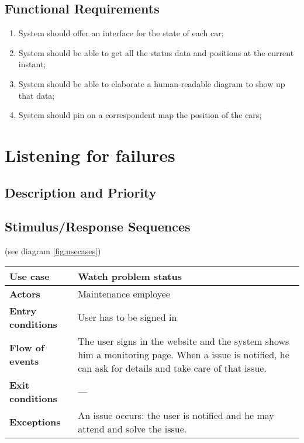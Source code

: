 \documentclass{scrreprt}
\begin{document}
\subsection{Functional Requirements}
\begin{enumerate}[label=R\arabic*.,resume]
\item System should offer an interface for the state of each car;
\item System should be able to get all the status data and positions at the current instant;
\item System should be able to elaborate a human-readable diagram to show up that data; 
\item System should pin on a correspondent map the position of the cars;
\end{enumerate}

\section{Listening for failures}
\subsection{Description and Priority}

\subsection{Stimulus/Response Sequences}
(see diagram \vref{fig:usecases})

\begin{center}
\begin{tabularx}{\columnwidth}{>{\bfseries}lX}
\toprule
Use case & Watch problem status\\
\midrule
Actors & Maintenance employee\\
\midrule
Entry conditions & User has to be signed in\\
\midrule
Flow of events & The user signs in the website and the system shows him a monitoring page. When a issue is notified, he can ask for details and take care of that issue.\\
\midrule
Exit conditions & ---\\
\midrule
Exceptions & An issue occurs: the user is notified and he may attend and solve the issue.\\
\bottomrule
\end{tabularx}
\end{center}
\end{document}
